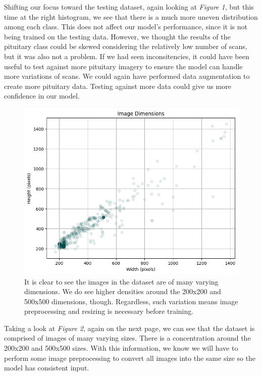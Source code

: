 \documentclass[conference]{IEEEtran}
\begin{document}
Shifting our focus toward the testing dataset, again looking at \textit{Figure 1}, but this time at the right histogram, we see that there is a much more uneven distribution among each class. This does not affect our model's performance, since it is not being trained on the testing data. However, we thought the results of the pituitary class could be skewed considering the relatively low number of scans, but it was also not a problem. If we had seen inconsitencies, it could have been useful to test against more pituitary imagery to ensure the model can handle more variations of scans. We could again have performed data augmentation to create more pituitary data. Testing against more data could give us more confidence in our model.

\begin{figure}[!ht]
    \centering
    \includegraphics[width=5in]{ImageDimensions.png}
    \caption{\large It is clear to see the images in the dataset are of many varying dimensions. We do see higher densities around the 200x200 and 500x500 dimensions, though. Regardless, such variation means image preprocessing and resizing is necessary before training.}
    \label{Dimensions of images in the dataset}
\end{figure}

Taking a look at \textit{Figure 2}, again on the next page, we can see that the dataset is comprised of images of many varying sizes. There is a concentration around the 200x200 and 500x500 sizes. With this information, we know we will have to perform some image preprocessing to convert all images into the same size so the model has consistent input. 
\end{document}
